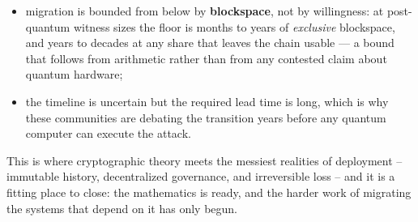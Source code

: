 \begin{itemize}
  \item migration is bounded from below by \textbf{blockspace}, not by willingness: at post-quantum witness sizes the floor is months to years of \emph{exclusive} blockspace, and years to decades at any share that leaves the chain usable --- a bound that follows from arithmetic rather than from any contested claim about quantum hardware;
  \item the timeline is uncertain but the required lead time is long, which is why these communities are debating the transition years before any quantum computer can execute the attack.
\end{itemize}

This is where cryptographic theory meets the messiest realities of deployment -- immutable history, decentralized governance, and irreversible loss -- and it is a fitting place to close: the mathematics is ready, and the harder work of migrating the systems that depend on it has only begun.
